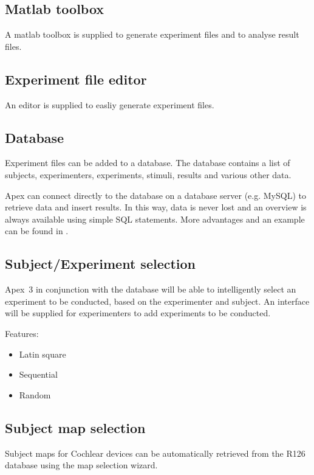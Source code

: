 \documentclass[a4paper,12pt]{article}
\begin{document}
\subsection{Matlab toolbox}

A matlab toolbox is supplied to generate experiment files and to analyse result files. 

\subsection{Experiment file editor}

An editor is supplied to easliy generate experiment files. 

\subsection{Database}

\label{database}

Experiment files can be added to a database. The database contains a list of subjects, experimenters, experiments, stimuli, results and various other data. 

Apex can connect directly to the database on a database server (e.g. MySQL) to retrieve data and insert results. In this way, data is never lost and an overview is always available using simple SQL statements. More advantages and an example can be found in \cite{BMS05}. 

\subsection{Subject/Experiment selection}

Apex~3 in conjunction with the database will be able to intelligently select an experiment to be conducted, based on the experimenter and subject. An interface will be supplied for experimenters to add experiments to be conducted. 

Features:
\begin{itemize}
\item Latin square
\item Sequential
\item Random
\end{itemize}

\subsection{Subject map selection}

Subject maps for Cochlear devices can be automatically retrieved from the R126 database using the map selection wizard. 
\end{document}
